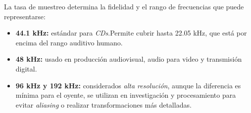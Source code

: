 La tasa de muestreo determina la fidelidad y el rango de frecuencias que puede representarse:
\begin{itemize}
    \item \textbf{44.1 kHz:} estándar para \textit{CDs}.Permite cubrir hasta 22.05 kHz, que está por encima del rango auditivo humano.
    \item \textbf{48 kHz:} usado en producción audiovisual, audio para video y transmisión digital.
    \item \textbf{96 kHz y 192 kHz:} considerados \textit{alta resolución}, aunque la diferencia es mínima para el oyente, se utilizan en investigación y procesamiento para evitar \textit{aliasing} o realizar transformaciones más detalladas.
\end{itemize}